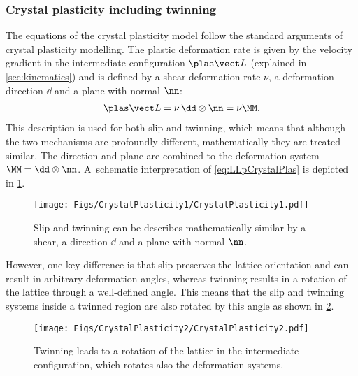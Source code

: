 \subsubsection{Crystal plasticity including twinning}
The equations of the crystal plasticity model follow the standard arguments of crystal plasticity modelling\supercite{roters_crystal_2010}. The plastic deformation rate is given by the velocity gradient in the intermediate configuration $\LLp$ (explained in \cref{sec:kinematics}) and is defined by a shear deformation rate $\nu$, a deformation direction $\dd$ and a plane with normal $\nn$:
\begin{align}
  \LLp = \nu \, \dd\otimes\nn = \nu\MM.
  \label{eq:LLpCrystalPlas}
\end{align}
This description is used for both slip and twinning, which means that although the two mechanisms are profoundly different, mathematically they are treated similar. The direction and plane are combined to the deformation system \mbox{$\MM=\dd\otimes\nn$}. A~schematic interpretation of \cref{eq:LLpCrystalPlas} is depicted in \cref{fig:CrystalPlasticity1}. \\
\begin{figure}[h!]
  \centering
  \texttt{[image: Figs/CrystalPlasticity1/CrystalPlasticity1.pdf]}
  \caption{Slip and twinning can be describes mathematically similar by a shear, a direction $\dd$ and a plane with normal $\nn$.}
  \label{fig:CrystalPlasticity1}
\end{figure}

However, one key difference is that slip preserves the lattice orientation and can result in arbitrary deformation angles, whereas twinning results in a rotation of the lattice through a well-defined angle. This means that the slip and twinning systems inside a twinned region are also rotated by this angle as shown in \cref{fig:CrystalPlasticity2}. \\
\begin{figure}[h!]
  \centering
  \texttt{[image: Figs/CrystalPlasticity2/CrystalPlasticity2.pdf]}
  \caption{Twinning leads to a rotation of the lattice in the intermediate configuration, which rotates also the deformation systems.}
  \label{fig:CrystalPlasticity2}
\end{figure}

